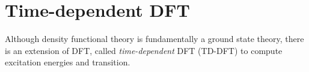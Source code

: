 \documentclass[../Main/notes.tex]{subfiles}
\begin{document}
\section{Time-dependent DFT}

Although density functional theory is fundamentally a ground state theory, there is an extension of DFT, called \emph{time-dependent} DFT (TD-DFT) to compute excitation energies and transition.


%
%
%
%
%
%
%
%
%
%
%
%
\end{document}
